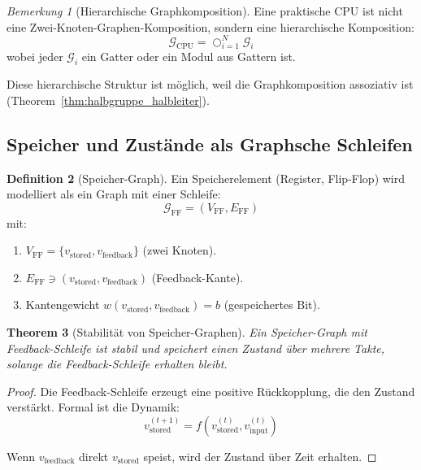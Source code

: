 \documentclass[12pt, a4paper]{article}
\newtheorem{theorem}{Theorem}[section]
\theoremstyle{definition}
\newtheorem{definition}[theorem]{Definition}
\theoremstyle{remark}
\newtheorem{remark}[theorem]{Bemerkung}
\newcommand{\Graph}{\mathcal{G}}
\begin{document}
\begin{remark}[Hierarchische Graphkomposition]
Eine praktische CPU ist nicht eine Zwei-Knoten-Graphen-Komposition, sondern eine hierarchische Komposition:
\[
  \Graph_{\mathrm{CPU}} = \bigcirc_{i=1}^{N} \Graph_i
\]
wobei jeder $\Graph_i$ ein Gatter oder ein Modul aus Gattern ist.

Diese hierarchische Struktur ist möglich, weil die Graphkomposition assoziativ ist (Theorem~\ref{thm:halbgruppe_halbleiter}).
\end{remark}

\subsection{Speicher und Zustände als Graphsche Schleifen}
\label{subsec:speicher_schleifen}

\begin{definition}[Speicher-Graph]
\label{def:speicher_graph}
Ein Speicherelement (Register, Flip-Flop) wird modelliert als ein Graph mit einer Schleife:
\[
  \Graph_{\mathrm{FF}} = (V_{\mathrm{FF}}, E_{\mathrm{FF}})
\]
mit:
\begin{enumerate}[label=(\alph*)]
  \item $V_{\mathrm{FF}} = \{v_{\mathrm{stored}}, v_{\mathrm{feedback}}\}$ (zwei Knoten).
  \item $E_{\mathrm{FF}} \ni (v_{\mathrm{stored}}, v_{\mathrm{feedback}})$ (Feedback-Kante).
  \item Kantengewicht $w(v_{\mathrm{stored}}, v_{\mathrm{feedback}}) = b$ (gespeichertes Bit).
\end{enumerate}
\end{definition}

\begin{theorem}[Stabilität von Speicher-Graphen]
\label{thm:speicher_stabilität}
Ein Speicher-Graph mit Feedback-Schleife ist stabil und speichert einen Zustand über mehrere Takte, solange die Feedback-Schleife erhalten bleibt.
\end{theorem}

\begin{proof}
Die Feedback-Schleife erzeugt eine positive Rückkopplung, die den Zustand verstärkt. Formal ist die Dynamik:
\[
  v_{\mathrm{stored}}^{(t+1)} = f(v_{\mathrm{stored}}^{(t)}, v_{\mathrm{input}}^{(t)})
\]

Wenn $v_{\mathrm{feedback}}$ direkt $v_{\mathrm{stored}}$ speist, wird der Zustand über Zeit erhalten.
\end{proof}
\end{document}
